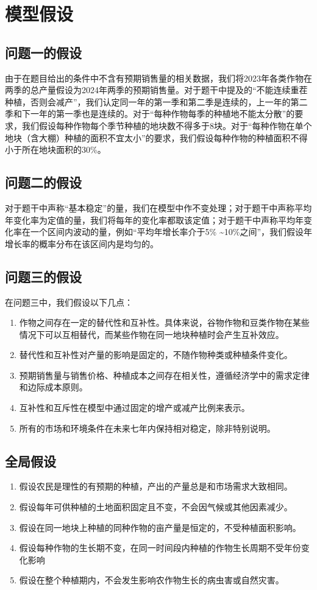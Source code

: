 \documentclass{cumcmthesis}
\begin{document}
\section{模型假设}
\subsection{问题一的假设}
由于在题目给出的条件中不含有预期销售量的相关数据，我们将2023年各类作物在两季的总产量假设为2024年两季的预期销售量。对于题干中提及的“不能连续重茬种植，否则会减产”，我们认定同一年的第一季和第二季是连续的，上一年的第二季和下一年的第一季也是连续的。对于“每种作物每季的种植地不能太分散”的要求，我们假设每种作物每个季节种植的地块数不得多于8块。对于“每种作物在单个地块（含大棚）种植的面积不宜太小”的要求，我们假设每种作物的种植面积不得小于所在地块面积的30\%。
\subsection{问题二的假设}
对于题干中声称“基本稳定”的量，我们在模型中作不变处理；对于题干中声称平均年变化率为定值的量，我们将每年的变化率都取该定值；对于题干中声称平均年变化率在一个区间内波动的量，例如“平均年增长率介于5\% \textasciitilde 10\%之间”，我们假设年增长率的概率分布在该区间内是均匀的。
\subsection{问题三的假设}
在问题三中，我们假设以下几点：
\begin{enumerate}
    \item 作物之间存在一定的替代性和互补性。具体来说，谷物作物和豆类作物在某些情况下可以互相替代，而某些作物在同一地块种植时会产生互补效应。
    \item 替代性和互补性对产量的影响是固定的，不随作物种类或种植条件变化。
    \item 预期销售量与销售价格、种植成本之间存在相关性，遵循经济学中的需求定律和边际成本原则。
    \item 互补性和互斥性在模型中通过固定的增产或减产比例来表示。
    \item 所有的市场和环境条件在未来七年内保持相对稳定，除非特别说明。
\end{enumerate}




\subsection{全局假设}
\begin{enumerate}
    \item 假设农民是理性的有预期的种植，产出的产量总是和市场需求大致相同。
    \item 假设每年可供种植的土地面积固定且不变，不会因气候或其他因素减少。
    \item 假设在同一地块上种植的同种作物的亩产量是恒定的，不受种植面积影响。
    \item 假设每种作物的生长期不变，在同一时间段内种植的作物生长周期不受年份变化影响
    \item 假设在整个种植期内，不会发生影响农作物生长的病虫害或自然灾害。
\end{enumerate}
\end{document}
